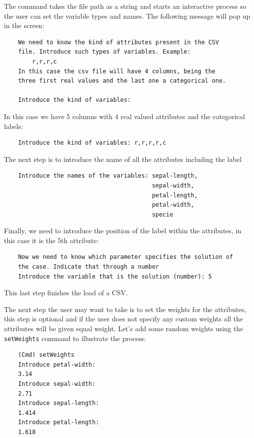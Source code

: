 \documentclass[11pt]{article}
\begin{document}
The command takes the file path as a string and starts an interactive process so the user can set the variable types and names. The following message will pop up in the screen:
\begin{verbatim}
    We need to know the kind of attributes present in the CSV 
    file. Introduce such types of variables. Example:
        r,r,r,c
    In this case the csv file will have 4 columns, being the 
    three first real values and the last one a categorical one.

    Introduce the kind of variables:
\end{verbatim}

In this case we have 5 columns with 4 real valued attributes and the categorical labels:
\begin{verbatim}
    Introduce the kind of variables: r,r,r,r,c
\end{verbatim}

The next step is to introduce the name of all the attributes including the label
\begin{verbatim}
    Introduce the names of the variables: sepal-length, 
                                          sepal-width, 
                                          petal-length, 
                                          petal-width, 
                                          specie
\end{verbatim}

Finally, we need to introduce the position of the label within the attributes, in this case it is the 5th attribute:
\begin{verbatim}
    Now we need to know which parameter specifies the solution of 
    the case. Indicate that through a number
    Introduce the variable that is the solution (number): 5
\end{verbatim}

This last step finishes the load of a CSV. 

The next step the user may want to take is to set the weights for the attributes, this step is optional and if the user does not specify any custom weights all the attributes will be given equal weight. Let's add some random weights using the \texttt{setWeights} command to illustrate the process:
\begin{verbatim}
    (Cmd) setWeights
    Introduce petal-width:
    3.14
    Introduce sepal-width:
    2.71
    Introduce sepal-length:
    1.414
    Introduce petal-length:
    1.618
\end{verbatim}
\end{document}
